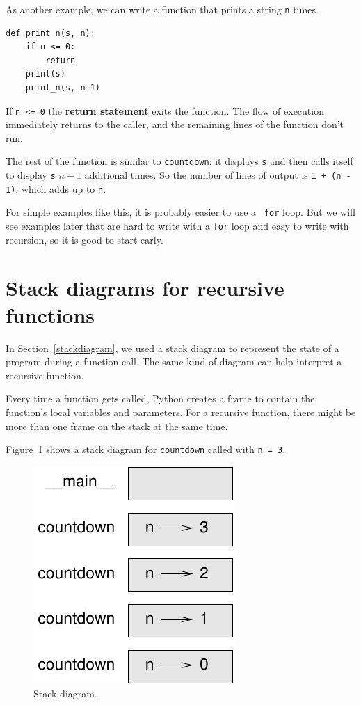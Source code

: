 \documentclass[10pt]{book}
\begin{document}
As another example, we can write a function that prints a
string {\tt n} times.

\begin{verbatim}
def print_n(s, n):
    if n <= 0:
        return
    print(s)
    print_n(s, n-1)
\end{verbatim}
%
If {\tt n <= 0} the {\bf return statement} exits the function.  The
flow of execution immediately returns to the caller, and the remaining
lines of the function don't run.

The rest of the function is similar to {\tt countdown}: it displays
{\tt s} and then calls itself to display {\tt s} $n-1$ additional
times.  So the number of lines of output is {\tt 1 + (n - 1)}, which
adds up to {\tt n}.

For simple examples like this, it is probably easier to use a {\tt
for} loop.  But we will see examples later that are hard to write
with a {\tt for} loop and easy to write with recursion, so it is
good to start early.


\section{Stack diagrams for recursive functions}
\label{recursive.stack}

In Section~\ref{stackdiagram}, we used a stack diagram to represent
the state of a program during a function call.  The same kind of
diagram can help interpret a recursive function.

Every time a function gets called, Python creates a
frame to contain the function's local variables and parameters.
For a recursive function, there might be more than one frame on the
stack at the same time.

Figure~\ref{fig.stack2} shows a stack diagram for {\tt countdown} called with
{\tt n = 3}.

\begin{figure}
\centerline
{\includegraphics[scale=0.8]{figs/stack2.pdf}}
\caption{Stack diagram.}
\label{fig.stack2}
\end{figure}
\end{document}
